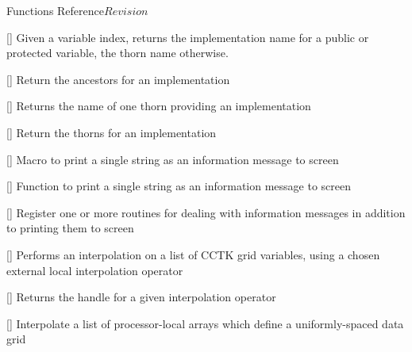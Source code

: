 \begin{cactuspart}{ Functions Reference}{}{$Revision$}
\begin{Lentry}
\item[\code{CCTK\_ImpFromVarI}] [\pageref{CCTK-ImpFromVarI}]
  Given a variable index, returns the implementation name for
  a public or protected variable, the thorn name otherwise.

\item[\code{CCTK\_ImplementationRequires}]
  [\pageref{CCTK-ImplementationRequires}]
  Return the ancestors for an implementation

\item[\code{CCTK\_ImplementationThorn}]
  [\pageref{CCTK-ImplementationThorn}]
  Returns the name of one thorn providing an implementation

\item[\code{CCTK\_ImpThornList}] [\pageref{CCTK-ImpThornList}]
  Return the thorns for an implementation

\item[\code{CCTK\_INFO}] [\pageref{CCTK-INFO}]
  Macro to print a single string as an information message to screen

\item[\code{CCTK\_Info}] [\pageref{CCTK-Info}]
  Function to print a single string as an information message to screen

\item[\code{CCTK\_InfoCallbackRegister}] [\pageref{CCTK-INFOCallbackRegister}]
  Register one or more routines for dealing with information messages
  in addition to printing them to screen

\item[\code{CCTK\_InterpGridArrays}] [\pageref{CCTK-InterpGridArrays}]
  Performs an interpolation on a list of CCTK grid variables,
  using a chosen external local interpolation operator

\item[\code{CCTK\_InterpHandle}] [\pageref{CCTK-InterpHandle}]
  Returns the handle for a given interpolation operator


\item[\code{CCTK\_InterpLocalUniform}] [\pageref{CCTK-InterpLocalUniform}]
  Interpolate a list of processor-local arrays
  which define a uniformly-spaced data grid



\end{Lentry}
\end{cactuspart}
